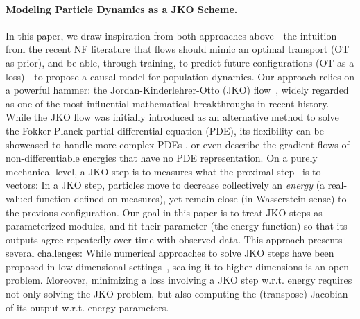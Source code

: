 \paragraph{Modeling Particle Dynamics as a JKO Scheme.} In this paper, we draw inspiration from both approaches above---the intuition from the recent NF literature that flows should mimic an optimal transport (OT as prior), and be able, through training, to predict future configurations (OT as a loss)---to propose a causal model for population dynamics. Our approach relies on a powerful hammer: the Jordan-Kinderlehrer-Otto (JKO) flow~\citep{jordan1998variational}, widely regarded as one of the most influential mathematical breakthroughs in recent history. While the JKO flow was initially introduced as an alternative method to solve the Fokker-Planck partial differential equation (PDE), its flexibility can be showcased to handle more complex PDEs \cite[\S4.7]{santambrogio2017euclidean}, or even describe the gradient flows of non-differentiable energies that have no PDE representation.
On a purely mechanical level, a JKO step is to measures what the proximal step~\citep{combettes2011proximal} is to vectors: In a JKO step, particles move to decrease collectively an {\em energy} (a real-valued function defined on measures), yet remain close (in Wasserstein sense) to the previous configuration. Our goal in this paper is to treat JKO steps as parameterized modules, and fit their parameter (the energy function) so that its outputs agree repeatedly over time with observed data. 
This approach presents several challenges: While numerical approaches to solve JKO steps have been proposed in low dimensional settings~\citep{burger2010, carrillo2021primal, peyre2015entropic,benamou2016augmented}, scaling it to higher dimensions is an open problem. Moreover, minimizing a loss involving a JKO step w.r.t. energy requires not only solving the JKO problem, but also computing the (transpose) Jacobian of its output w.r.t. energy parameters.


